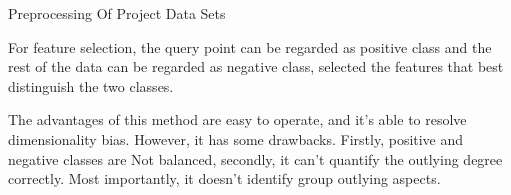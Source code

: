 \documentclass[
 size=14pt,
 paper=smartboard,  %
 mode=present, 		%
 display=slides, 	%
 style=tuliplab,  	%
 pauseslide,
 fleqn,leqno]{powerdot}
\begin{document}
\begin{slide}{Preprocessing Of Project Data Sets}
\begin{note}
For feature selection,
the query point can be regarded as positive class and
the rest of the data can be regarded as negative class,
selected the features that best distinguish the two classes.

The advantages of this method are easy to operate,
and it's able to resolve dimensionality bias.
However, it has some drawbacks.
Firstly,
positive and negative classes are Not balanced,
secondly,
it can't quantify the outlying degree correctly.
Most importantly,
it doesn't identify group outlying aspects.
\end{note}

\end{slide}





  
\end{document}
